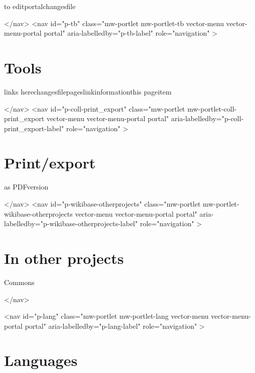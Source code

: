 \documentclass{article}\usepackage{titlesec}
\begin{document}
		
		\begin{itemize}\itemHelp\itemLearn to edit\itemCommunity portal\itemRecent changes\itemUpload file\end{itemize}
		
	
</nav>
<nav id="p-tb" class="mw-portlet mw-portlet-tb vector-menu vector-menu-portal portal" aria-labelledby="p-tb-label" role="navigation" 
	 >
	\section{Tools}
	
		
		\begin{itemize}\itemWhat links here\itemRelated changes\itemUpload file\itemSpecial pages\itemPermanent link\itemPage information\itemCite this page\itemWikidata item\end{itemize}
		
	
</nav>
<nav id="p-coll-print\_export" class="mw-portlet mw-portlet-coll-print\_export vector-menu vector-menu-portal portal" aria-labelledby="p-coll-print\_export-label" role="navigation" 
	 >
	\section{Print/export}
	
		
		\begin{itemize}\itemDownload as PDF\itemPrintable version\end{itemize}
		
	
</nav>
<nav id="p-wikibase-otherprojects" class="mw-portlet mw-portlet-wikibase-otherprojects vector-menu vector-menu-portal portal" aria-labelledby="p-wikibase-otherprojects-label" role="navigation" 
	 >
	\section{In other projects}
	
		
		\begin{itemize}\itemWikimedia Commons\itemWikibooks\itemWikiquote\itemWikiversity\end{itemize}
		
	
</nav>

	<nav id="p-lang" class="mw-portlet mw-portlet-lang vector-menu vector-menu-portal portal" aria-labelledby="p-lang-label" role="navigation" 
	 >
	\section{Languages}
	
\end{document}
